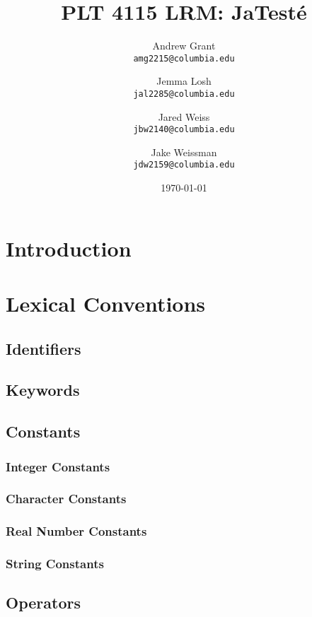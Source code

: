 \documentclass{article}
\title{PLT 4115 LRM: \textbf{JaTest\'{e}}}
\author{
	Andrew Grant\\
	\texttt{amg2215@columbia.edu}
	\and
	Jemma Losh\\
	\texttt{jal2285@columbia.edu}
	\and
	Jared Weiss\\
	\texttt{jbw2140@columbia.edu}
	\and
	Jake Weissman\\
	\texttt{jdw2159@columbia.edu}
}
\date{\today}
\begin{document}
\maketitle

\section{Introduction}

\section{Lexical Conventions}

\subsection{Identifiers}

\subsection{Keywords}

\subsection{Constants}

\subsubsection{Integer Constants}


\subsubsection{Character Constants}

\subsubsection{Real Number Constants}

\subsubsection{String Constants}

\subsection{Operators}
\end{document}
